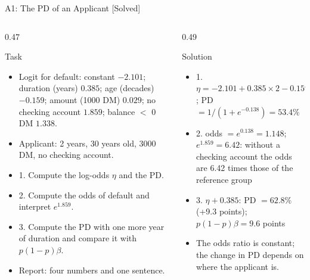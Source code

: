 \begin{frame}{A1: The PD of an Applicant [Solved]}
\itemsize{\scriptsize}
\begin{columns}[T]
\begin{column}{0.47\textwidth}
\begin{block}{Task}
\begin{itemize}
    \item Logit for default: constant $-2.101$; duration (years) $0.385$; age (decades) $-0.159$; amount (1000 DM) $0.029$; no checking account $1.859$; balance $<$ 0 DM $1.338$.
    \item Applicant: 2 years, 30 years old, 3000 DM, no checking account.
    \item 1. Compute the log-odds $\eta$ and the PD.
    \item 2. Compute the odds of default and interpret $e^{1.859}$.
    \item 3. Compute the PD with one more year of duration and compare it with $p(1 - p)\beta$.
    \item Report: four numbers and one sentence.
\end{itemize}
\end{block}
\end{column}
\begin{column}{0.49\textwidth}
\begin{exampleblock}{Solution}
\begin{itemize}
    \item 1. $\eta = -2.101 + 0.385 \times 2 - 0.159 \times 3 + 0.029 \times 3 + 1.859 = 0.138$; PD $= 1/(1 + e^{-0.138}) = 53.4\%$
    \item 2. odds $= e^{0.138} = 1.148$; $e^{1.859} = 6.42$: without a checking account the odds are 6.42 times those of the reference group
    \item 3. $\eta + 0.385$: PD $= 62.8\%$ (+9.3 points); $p(1 - p)\beta = 9.6$ points
    \item The odds ratio is constant; the change in PD depends on where the applicant is.
\end{itemize}
\end{exampleblock}
\end{column}
\end{columns}
\end{frame}

